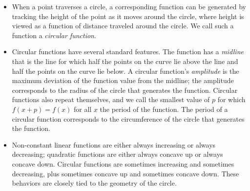 \documentclass[nooutcomes, noauthor]{ximera}
\begin{document}
\begin{summary}\begin{itemize}
\item When a point traverses a circle, a corresponding function can be generated by tracking the height of the point as it moves around the circle, where height is viewed as a function of distance traveled around the circle.  We call such a function a \emph{circular function}.  
\item Circular functions have several standard features.  The function has a \emph{midline} that is the line for which half the points on the curve lie above the line and half the points on the curve lie below.  A circular function's \emph{amplitude} is the maximum deviation of the function value from the midline; the amplitude corresponds to the radius of the circle that generates the function.  Circular functions also repeat themselves, and we call the smallest value of \(p\) for which \(f(x+p) = f(x)\) for all \(x\) the period of the function.  The period of a circular function corresponds to the circumference of the circle that generates the function.%
\item Non-constant linear functions are either always increasing or always decreasing; quadratic functions are either always concave up or always concave down.  Circular functions are sometimes increasing and sometimes decreasing, plus sometimes concave up and sometimes concave down.  These behaviors are closely tied to the geometry of the circle.%
\end{itemize}\end{summary}
\end{document}
